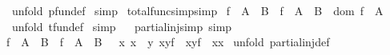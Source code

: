 \begin{isabellebody}
%
\isadelimproof
%
\endisadelimproof
%
\isatagproof
{}\isamarkupfalse%
\ {\isacharparenleft}unfold\ pfun{\isacharunderscore}def{\isacharparenright}\isanewline
{}\isamarkupfalse%
\ simp\isanewline
{}\isamarkupfalse%
%
\endisatagproof
{\isafoldproof}%
%
\isadelimproof
\isanewline
%
\endisadelimproof
\isanewline
\isanewline
\isanewline
{}\isamarkupfalse%
\ total{\isacharunderscore}func{\isacharunderscore}simp{\isacharbrackleft}simp{\isacharbrackright}{\isacharcolon}\ \isanewline
{\isachardoublequoteopen}{\isacharparenleft}f\ {\isacharcolon}\ {\isacharparenleft}A\ {\isacharminus}{\isacharminus}{\isacharminus}{\isachargreater}\ B{\isacharparenright}{\isacharparenright}\ {\isacharequal}\ {\isacharparenleft}f\ {\isacharcolon}\ {\isacharparenleft}A\ {\isacharminus}{\isacharbar}{\isacharminus}{\isachargreater}\ B{\isacharparenright}\ {\isacharampersand}\ dom\ f\ {\isacharequal}\ A{\isacharparenright}{\isachardoublequoteclose}\isanewline
%
\isadelimproof
%
\endisadelimproof
%
\isatagproof
{}\isamarkupfalse%
\ {\isacharparenleft}unfold\ tfun{\isacharunderscore}def{\isacharparenright}\isanewline
{}\isamarkupfalse%
\ simp\isanewline
{}\isamarkupfalse%
%
\endisatagproof
{\isafoldproof}%
%
\isadelimproof
\isanewline
%
\endisadelimproof
\ \isanewline
{}\isamarkupfalse%
\ partial{\isacharunderscore}inj{\isacharunderscore}simp\ {\isacharbrackleft}simp{\isacharbrackright}{\isacharcolon}\ \isanewline
{\isachardoublequoteopen}{\isacharparenleft}f\ {\isacharcolon}\ {\isacharparenleft}A\ {\isachargreater}{\isacharminus}{\isacharbar}{\isacharminus}{\isachargreater}\ B{\isacharparenright}{\isacharparenright}\ {\isacharequal}\ {\isacharparenleft}f\ {\isacharcolon}\ {\isacharparenleft}A\ {\isacharminus}{\isacharbar}{\isacharminus}{\isachargreater}\ B{\isacharparenright}\ {\isacharampersand}\ {\isacharparenleft}{\isacharbang}\ x{}\ x{}{\isachardot}\ {\isacharparenleft}{\isacharquery}\ y{\isachardot}\ {\isacharparenleft}x{}{\isacharcomma}y{\isacharparenright}{\isacharcolon}f\ {\isacharampersand}\ {\isacharparenleft}x{}{\isacharcomma}y{\isacharparenright}{\isacharcolon}f{\isacharparenright}\ {\isacharminus}{\isacharminus}{\isachargreater}\ x{}{\isacharequal}x{}{\isacharparenright}{\isacharparenright}{\isachardoublequoteclose}\isanewline
%
\isadelimproof
%
\endisadelimproof
%
\isatagproof
{}\isamarkupfalse%
\ {\isacharparenleft}unfold\ partial{\isacharunderscore}inj{\isacharunderscore}def{\isacharparenright}\isanewline

\end{isabellebody}
